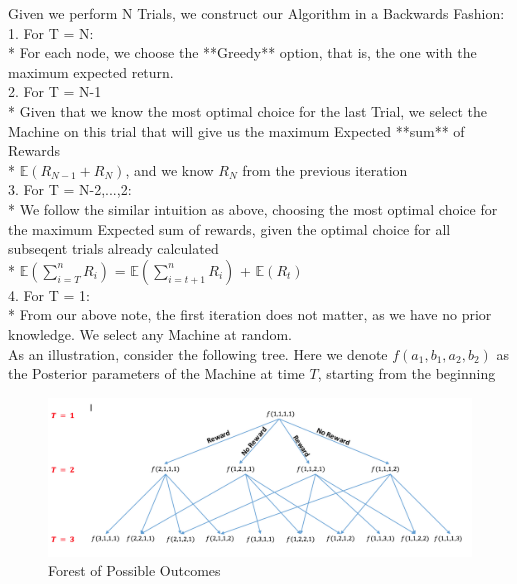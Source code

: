 \documentclass{article}
\begin{document}
Given we perform N Trials, we construct our Algorithm in a Backwards Fashion:\\

1. For T = N:\\
    * For each node, we choose the **Greedy** option, that is, the one with the maximum expected return.\\

2. For T = N-1\\
    * Given that we know the most optimal choice for the last Trial, we select the Machine on this trial that will give us the maximum Expected **sum** of Rewards\\
    * $\mathbb{E}(R_{N-1} + R_{N})$, and we know $R_N$ from the previous iteration\\
    
3. For T = N-2,...,2:\\
    * We follow the similar intuition as above, choosing the most optimal choice for the maximum Expected sum of rewards, given the optimal choice for all subseqent trials already calculated\\
    * $\mathbb{E}(\displaystyle\sum_{i=T}^{n} R_i)$ = $\mathbb{E}(\displaystyle\sum_{i=t+1}^{n} R_i)$ + $\mathbb{E}(R_t)$\\
    
4. For T = 1:\\
    * From our above note, the first iteration does not matter, as we have no prior knowledge. We select any Machine at random.\\

As an illustration, consider the following tree. Here we denote $f(a_1, b_1, a_2, b_2)$ as the Posterior parameters of the Machine at time $T$, starting from the beginning\\

\begin{figure}[H]
\centering
\includegraphics[scale=0.75]{Dynamic_Programming_Tree.png}
\caption{Forest of Possible Outcomes}
\end{figure}
\end{document}
